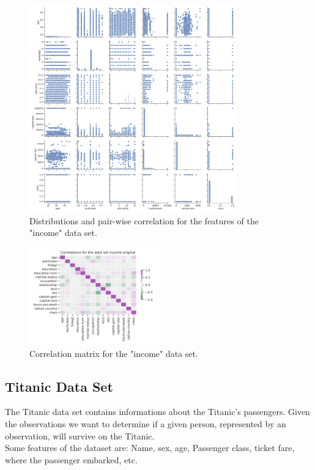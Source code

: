 \documentclass{article}
\begin{document}
\begin{figure}[h!]
	\centering
	\includegraphics[width=0.8\textwidth]{../plots/income_pairplot_reduced_original.png}
	\caption{ Distributions and pair-wise correlation for the features of the "income" data set.}
	\label{pairplot_income}
\end{figure}


\begin{figure}[h!]
	\centering
	\includegraphics[width=0.5\textwidth]{../plots/income_correlations_original.png}
	\caption{Correlation matrix for the "income" data set. }
	\label{correlation_income}
\end{figure}



\clearpage
\subsection{Titanic Data Set}
The Titanic data set \cite{titanic} contains informations about the Titanic's passengers. Given the observations we want to determine if a given person, represented by an observation, will survive on the Titanic.\\
Some features of the dataset are: Name, sex, age, Passenger class, ticket fare, where the passenger embarked, etc.
\end{document}
